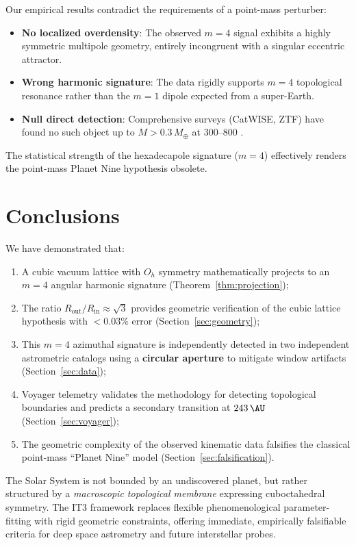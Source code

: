 \documentclass[11pt,a4paper]{article}
\theoremstyle{remark}
\newcommand{\Oh}{O_h}
\begin{document}
Our empirical results contradict the requirements of a point-mass perturber:
\begin{itemize}
\item \textbf{No localized overdensity}: The observed $m=4$ signal exhibits a highly symmetric multipole geometry, entirely incongruent with a singular eccentric attractor.
\item \textbf{Wrong harmonic signature}: The data rigidly supports $m=4$ topological resonance rather than the $m=1$ dipole expected from a super-Earth.
\item \textbf{Null direct detection}: Comprehensive surveys (CatWISE, ZTF) have found no such object up to $M > 0.3\,M_\oplus$ at $300$--\SI{800}{\AU} \cite{brown2021constraints}.
\end{itemize}

The statistical strength of the hexadecapole signature ($m=4$) effectively renders the point-mass Planet Nine hypothesis obsolete.

\section{Conclusions}
\label{sec:conclusions}

We have demonstrated that:
\begin{enumerate}
 \item A cubic vacuum lattice with $\Oh$ symmetry mathematically projects to an $m=4$ angular harmonic signature (Theorem~\ref{thm:projection});
\item The ratio $R_{\text{out}}/R_{\text{in}} \approx \sqrt{3}$ provides geometric verification of the cubic lattice hypothesis with $<0.03\%$ error (Section~\ref{sec:geometry});
\item This $m=4$ azimuthal signature is independently detected in two independent astrometric catalogs using a \textbf{circular aperture} to mitigate window artifacts (Section~\ref{sec:data});
\item Voyager telemetry validates the methodology for detecting topological boundaries and predicts a secondary transition at $\SI{243}{\AU}$ (Section~\ref{sec:voyager});
\item The geometric complexity of the observed kinematic data falsifies the classical point-mass ``Planet Nine'' model (Section~\ref{sec:falsification}).
\end{enumerate}

The Solar System is not bounded by an undiscovered planet, but rather structured by a \textit{macroscopic topological membrane} expressing cuboctahedral symmetry. The IT3 framework replaces flexible phenomenological parameter-fitting with rigid geometric constraints, offering immediate, empirically falsifiable criteria for deep space astrometry and future interstellar probes.
\end{document}

